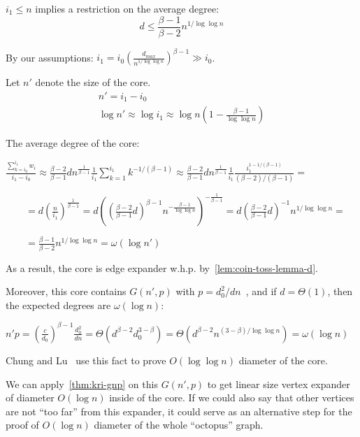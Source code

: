 $i_1\leq n$ implies a restriction on the average degree:
\begin{equation}
    d\leq\frac{\beta-1}{\beta-2}n^{1/\log\log n}
\end{equation}

By our assumptions: $i_1=i_0\left(\frac{d_{max}}{n^{1/\log\log n}}\right)^{\beta-1}\gg i_0$.

Let $n'$ denote the size of the core.
\begin{gather}
    n'=i_1-i_0\\
    \log n'\approx\log i_1\approx\log n\left(1-\frac{\beta-1}{\log\log n}\right)
\end{gather}

The average degree of the core:

$\frac{\sum_{k=i_0}^{i_1}{w_i}}{i_1-i_0}
\approx\frac{\beta-2}{\beta-1}dn^{\frac{1}{\beta-1}}\frac{1}{i_1}
\sum_{k=1}^{i_1}{k^{-1/(\beta-1)}}
\approx\frac{\beta-2}{\beta-1}dn^{\frac{1}{\beta-1}}\frac{1}{i_1}
\frac{i_1^{1-1/(\beta-1)}}{(\beta-2)/(\beta-1)}=$

$\qquad=d\left(\frac{n}{i_1}\right)^{\frac{1}{\beta-1}}
=d\left(\left(\frac{\beta-2}{\beta-1}d\right)^{\beta-1}n^{-\frac{\beta-1}{\log\log n}}\right)^{-\frac{1}{\beta-1}}
=d\left(\frac{\beta-2}{\beta-1}d\right)^{-1}n^{1/\log\log n}=$

$\qquad=\frac{\beta-1}{\beta-2}n^{1/\log\log n}=\omega(\log n')$

As a result, the core is edge expander w.h.p. by~\autoref{lem:coin-toss-lemma-d}.

Moreover, this core contains $G(n',p)$ with $p=d_0^2/dn$~\cite{cl04},
and if $d=\Theta(1)$, then the expected degrees are $\omega(\log n)$:

$n'p=\left(\frac{c}{d_0}\right)^{\beta-1}\frac{d_0^2}{dn}
=\Theta\left(d^{\beta-2}d_0^{3-\beta}\right)
=\Theta\left(d^{\beta-2}n^{(3-\beta)/\log\log n}\right)
=\omega(\log n)$

Chung and Lu~\cite{cl04} use this fact to prove $O(\log\log n)$ diameter of the core.

We can apply~\autoref{thm:kri-gnp} on this $G(n',p)$ to get linear size
vertex expander of diameter $O(\log n)$ inside of the core.
If we could also say that other vertices are not ``too far'' from this expander,
it could serve as an alternative step for the proof
of $O(\log n)$ diameter of the whole ``octopus'' graph.

